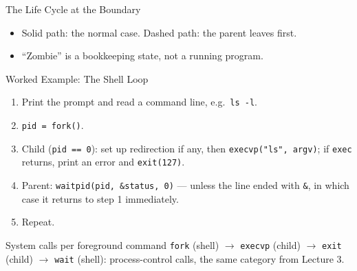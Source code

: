 \documentclass[aspectratio=169]{beamer}
\begin{document}
\begin{frame}{The Life Cycle at the Boundary}
  \centering
  \vspace{0.3cm}
  \begin{itemize}
    \item Solid path: the normal case. Dashed path: the parent leaves first.
    \item ``Zombie'' is a bookkeeping state, not a running program.
  \end{itemize}
\end{frame}

\begin{frame}{Worked Example: The Shell Loop}
  \begin{enumerate}
    \item Print the prompt and read a command line, e.g.\ \texttt{ls -l}.
    \item \texttt{pid = fork()}.
    \item Child (\texttt{pid == 0}): set up redirection if any, then
      \texttt{execvp("ls", argv)}; if \texttt{exec} returns, print an error
      and \texttt{exit(127)}.
    \item Parent: \texttt{waitpid(pid, \&status, 0)} --- unless the line ended
      with \texttt{\&}, in which case it returns to step 1 immediately.
    \item Repeat.
  \end{enumerate}
  \vspace{0.15cm}
  \begin{exampleblock}{System calls per foreground command}
    \texttt{fork} (shell) $\to$ \texttt{execvp} (child) $\to$ \texttt{exit}
    (child) $\to$ \texttt{wait} (shell):  process-control calls, the
    same category from Lecture 3.
  \end{exampleblock}
\end{frame}
\end{document}
